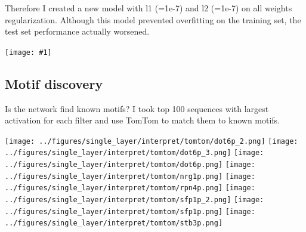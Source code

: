 \documentclass{article}
\newcommand{\includegraph}[1]{\texttt{[image: \#1]}}
\begin{document}
Therefore I created a new model with l1 (=1e-7) and l2 (=1e-7) on all weights regularization. Although this model prevented overfitting on the training set, the test set performance actually worsened. 

\includegraph{../figures/single_layer/20170605_092542_l1_1e-07_l2_1e-07/loss_vs_epoch.png}



\subsection{Motif discovery}
Is the network find known motifs? I took top 100 sequences with largest activation for each filter and use TomTom to match them to known motifs.

\texttt{[image: ../figures/single\_layer/interpret/tomtom/dot6p\_2.png]}
\texttt{[image: ../figures/single\_layer/interpret/tomtom/dot6p\_3.png]}
\texttt{[image: ../figures/single\_layer/interpret/tomtom/dot6p.png]}
\texttt{[image: ../figures/single\_layer/interpret/tomtom/nrg1p.png]}
\texttt{[image: ../figures/single\_layer/interpret/tomtom/rpn4p.png]}
\texttt{[image: ../figures/single\_layer/interpret/tomtom/sfp1p\_2.png]}
\texttt{[image: ../figures/single\_layer/interpret/tomtom/sfp1p.png]}
\texttt{[image: ../figures/single\_layer/interpret/tomtom/stb3p.png]}
\end{document}
